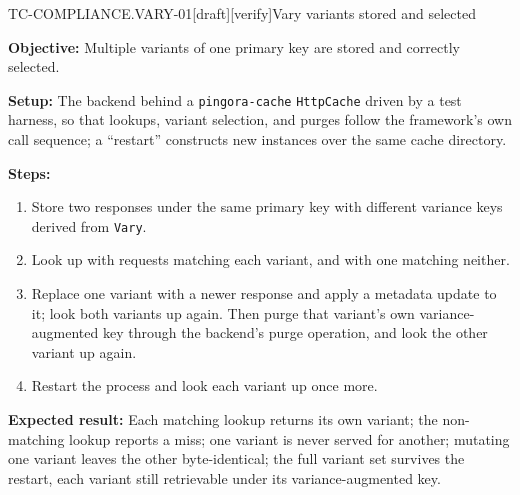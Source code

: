 \begin{requirement}{TC-COMPLIANCE.VARY-01}[draft][verify]{Vary variants stored and selected}


  \textbf{Objective:} Multiple variants of one primary key are stored and
  correctly selected.

  \textbf{Setup:} The backend behind a \texttt{pingora-cache}
  \texttt{HttpCache} driven by a test harness, so that lookups, variant
  selection, and purges follow the framework's own call sequence; a
  ``restart'' constructs new instances over the same cache directory.

  \textbf{Steps:}
  \begin{enumerate}
    \item Store two responses under the same primary key with different variance
      keys derived from \texttt{Vary}.
    \item Look up with requests matching each variant, and with one matching
      neither.
    \item Replace one variant with a newer response and apply a metadata update
      to it; look both variants up again. Then purge that variant's own
      variance-augmented key through the backend's purge operation, and look
      the other variant up again.
    \item Restart the process and look each variant up once more.
  \end{enumerate}

  \textbf{Expected result:} Each matching lookup returns its own variant; the
  non-matching lookup reports a miss; one variant is never served for another;
  mutating one variant leaves the other byte-identical; the full variant set
  survives the restart, each variant still retrievable under its
  variance-augmented key.



\end{requirement}

